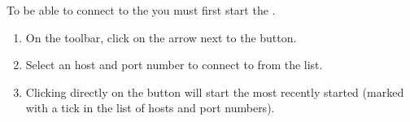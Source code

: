 

\label{connectserv}
To be able to connect to the \gdserver{} you must first start the \gdserver  {}.


\begin{enumerate}
\item On the toolbar, click on the arrow next to the  button. 
\item Select an \gdserver host and port number to connect to from the list. 
\item Clicking directly on the  button will start the most recently started \gdserver (marked with a tick in the list of \gdserver{} hosts and port numbers). 
\end{enumerate}
